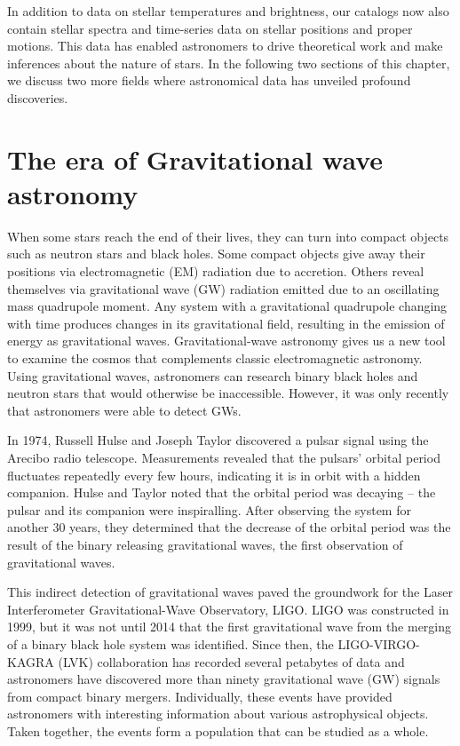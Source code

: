 In addition to data on stellar temperatures and brightness, our catalogs now also contain stellar spectra and time-series data on stellar positions and proper motions.
This data has enabled astronomers to drive theoretical work and make inferences about the nature of stars.
In the following two sections of this chapter, we discuss two more fields where astronomical data has unveiled profound discoveries. 



\section{The era of Gravitational wave astronomy}

When some stars reach the end of their lives, they can turn into compact objects such as neutron stars and black holes. 
Some compact objects give away their positions via electromagnetic (EM) radiation due to accretion. 
Others reveal themselves via gravitational wave (GW) radiation emitted due to an oscillating mass quadrupole moment.
Any system with a gravitational quadrupole changing with time produces changes in its gravitational field, resulting in the emission of energy as gravitational waves.
Gravitational-wave astronomy gives us a new tool to examine the cosmos that complements classic electromagnetic astronomy.
Using gravitational waves, astronomers can research binary black holes and neutron stars that would otherwise be inaccessible.
However, it was only recently that astronomers were able to detect GWs. 

In 1974, Russell Hulse and Joseph Taylor discovered a pulsar signal using the Arecibo radio telescope.
Measurements revealed that the pulsars' orbital period fluctuates repeatedly every few hours, indicating it is in orbit with a hidden companion.
Hulse and Taylor noted that the orbital period was decaying -- the pulsar and its companion were inspiralling.
After observing the system for another 30 years, they determined that the decrease of the orbital period was the result of the binary releasing gravitational waves, the first observation of gravitational waves.

This indirect detection of gravitational waves paved the groundwork for the Laser Interferometer Gravitational-Wave Observatory, LIGO. 
LIGO was constructed in 1999, but it was not until 2014 that the first gravitational wave from the merging of a binary black hole system was identified.
Since then, the LIGO-VIRGO-KAGRA (LVK) collaboration has recorded several petabytes of data and astronomers have discovered more than ninety gravitational wave (GW) signals from compact binary mergers.
Individually, these events have provided astronomers with interesting information about various astrophysical objects. 
Taken together, the events form a population that can be studied as a whole. 

